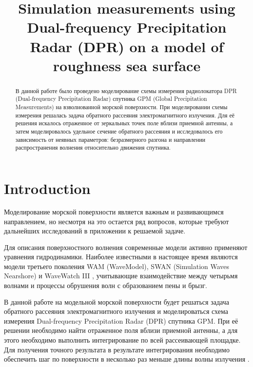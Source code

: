 \documentclass{article}
\title{Simulation measurements using Dual-frequency Precipitation Radar (DPR) on a
model of roughness sea surface}
\begin{document}
%
\maketitle
%
\begin{abstract}
    В данной работе было проведено моделирование схемы измерения радиолокатора
    DPR (Dual-frequency Precipitation Radar) спутника GPM (Global Precipitation
    Measurements) на взволнованной морской поверхности. При моделировании схемы
    измерения решалась задача обратного рассеяния электромагнитного излучения.
    Для её решения искалось отраженное от зеркальных точек поле вблизи приемной
    антенны, а затем моделировалось удельное сечение обратного рассеяния и
    исследовалось его зависимость от неявных параметров: безразмерного разгона
    и направлении распространения волнения относительно движения
    спутника.
\end{abstract}
%

%
\section{Introduction}
\label{sec:intro}

Моделирование морской поверхности является важным и развивающимся
направлением, но несмотря на это остается ряд вопросов, которые требуют дальнейших исследований в приложении к решаемой
задаче. 

Для описания поверхностного волнения современные модели активно применяют
уравнения гидродинамики. Наиболее известными в настоящее время являются модели
третьего поколения WAM (WaveModel), SWAN (Simulation Waves Nearshore) и
WaveWatch III \cite{wavewatch3, swan, wam4}, учитывающие взаимодействие между
четырьмя волнами и процессы обрушения волн с  образованием  пены  и  брызг.

В данной работе на модельной морской поверхности будет решаться задача
обратного рассеяния электромагнитного излучения и моделироваться схема
измерения Dual-frequency Precipitation Radar (DPR) спутника GPM. 
При её решении необходимо найти отраженное поля вблизи приемной антенны, а для
этого необходимо выполнить интегрирование по всей рассеивающей площадке.  Для
получения точного результата в результате интегрирования необходимо обеспечить
шаг по поверхности в несколько раз меньше длины волны излучения
\cite{toporkov:brown:2000, toporkov:brown:2002}. 
\end{document}
